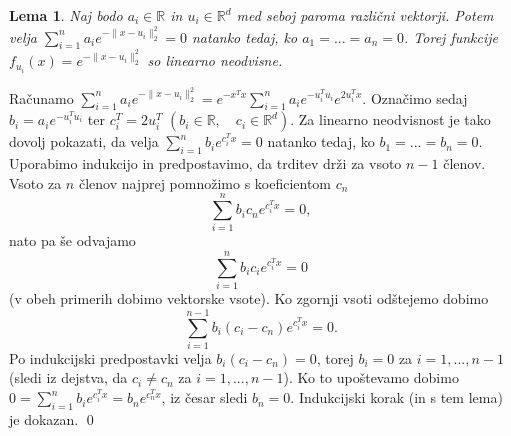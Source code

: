 \documentclass[12pt,a4paper]{amsart}
\theoremstyle{definition} %
\theoremstyle{plain} %
\newtheorem{lema}[definicija]{Lema}
\begin{document}
 \begin{lema}
 Naj bodo $a_i \in \mathbb{R}$ in $u_i \in \mathbb{R}^d$ med seboj paroma različni vektorji. Potem velja $\sum_{i=1}^n a_i e^{-\|x-u_i \|_2^2} = 0 $ natanko tedaj, ko $a_1 = ... = a_n = 0$. Torej funkcije $f_{u_i}(x) = e^{-\|x-u_i \|_2^2}$ so linearno neodvisne.
 \end{lema}
 \proof
 Računamo $\sum_{i=1}^n a_i e^{-\|x-u_i \|_2^2} = e^{-x^Tx}\sum_{i=1}^n a_i e^{-u_i^Tu_i}e^{2u_i^Tx}$. Označimo sedaj $b_i = a_ie^{-u_i^Tu_i}$ ter  $c_i^T = 2u_i^T$ $(b_i \in \mathbb{R}, \quad c_i \in \mathbb{R}^d).$ Za linearno neodvisnost je tako dovolj pokazati, da velja $\sum_{i=1}^n b_i e^{c_i^Tx} = 0$ natanko tedaj, ko $b_1 = ... = b_n = 0$. Uporabimo indukcijo in predpostavimo, da trditev drži za vsoto $n-1$ členov. Vsoto za $n$ členov najprej pomnožimo s koeficientom $c_n$ $$\sum_{i=1}^n b_i c_n e^{c_i^Tx} = 0,$$ nato pa še odvajamo $$\sum_{i=1}^n b_i c_i e^{c_i^Tx} = 0$$ (v obeh primerih dobimo vektorske vsote). Ko zgornji vsoti odštejemo dobimo $$\sum_{i=1}^{n-1} b_i (c_i-c_n) e^{c_i^Tx} = 0.$$ Po indukcijski predpostavki velja $b_i (c_i - c_n) = 0$, torej $b_i = 0$ za $i = 1, ..., n-1$ (sledi iz dejstva, da $c_i \neq c_n$ za $i=1,...,n-1$). Ko to upoštevamo dobimo $0 = \sum_{i=1}^n b_i e^{c_i^Tx} = b_n e^{c_n^Tx}$, iz česar sledi $b_n  = 0$. Indukcijski korak (in s tem lema) je dokazan.
 \qed
\end{document}
